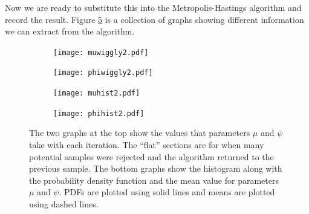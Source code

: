 \documentclass[12pt,twoside]{report}   %
\begin{document}
Now we are ready to substitute this into the Metropolis-Hastings algorithm and record the result. Figure \ref{fig1.8} is a collection of graphs showing different information we can extract from the algorithm.
\begin{figure}[H] 
  \begin{subfigure}[b]{0.5\linewidth}
    \centering
    \hspace{-13pt}
    \texttt{[image: muwiggly2.pdf]}
    \label{fig1.8:a}
  \end{subfigure}
  \begin{subfigure}[b]{0.5\linewidth}
    \centering
    \hspace{-13pt}
    \texttt{[image: phiwiggly2.pdf]}
    \label{fig1.8:b}
  \end{subfigure}\hfill%
  \begin{subfigure}[b]{0.5\linewidth}
    \centering
    \texttt{[image: muhist2.pdf]} 
    \label{fig1.8:c} 
  \end{subfigure}
  \begin{subfigure}[b]{0.5\linewidth}
    \centering
    \texttt{[image: phihist2.pdf]}
    \label{fig1.8:d} 
  \end{subfigure} 
  \caption{The two graphs at the top show the values that parameters $\mu$ and $\psi$ take with each iteration. The ``flat'' sections are for when many potential samples were rejected and the algorithm returned to the previous sample. The bottom graphs show the histogram along with the probability density function and the mean value for parameters $\mu$ and $\psi$. PDFs are plotted using solid lines and means are plotted using dashed lines.}
  \label{fig1.8} 
\end{figure}
\end{document}
